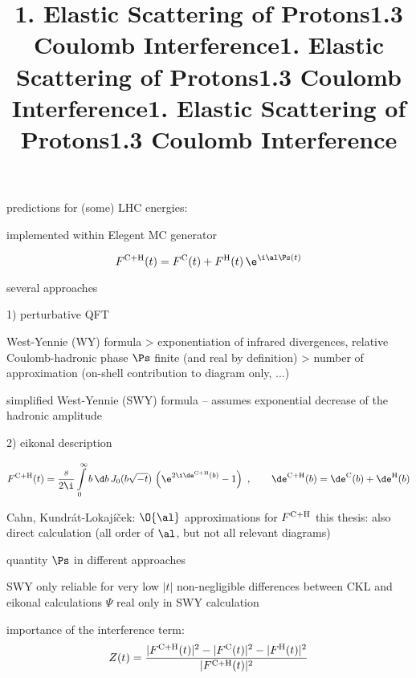 \> predictions for (some) LHC energies:

\centerline{}

\> implemented within Elegent MC generator


\newpage%
\title{1. Elastic Scattering of Protons\hfill 1.3 Coulomb Interference}

$$F^{\rm C+H}(t) = F^{\rm C}(t) + F^{\rm H}(t) \, \e^{\i \al \Ps(t)}$$

\> several approaches

1) perturbative QFT

\centerline{}

\> West-Yennie (WY) formula
\>> exponentiation of infrared divergences, relative Coulomb-hadronic phase $\Ps$ finite (and real by definition)
\>> number of approximation (on-shell contribution to diagram only, ...)

\> simplified West-Yennie (SWY) formula -- assumes exponential decrease of the hadronic amplitude


2) eikonal description

$$
	F^{\rm C+H}(t) = {s\over 2\i}\int\limits_0^\infty b\,\d b\,J_0(b\sqrt{-t})\,\left( \e^{2\i\de^{\rm C+H}(b)} - 1 \right)
	\ ,\qquad
	\de^{\rm C+H}(b) = \de^{\rm C}(b) + \de^{\rm H}(b)
$$

\> Cahn, Kundrát-Lokajíček: $\O{\al}$ approximations for $F^{\rm C+H}$
\> this thesis: also direct calculation (all order of $\al$, but not all relevant diagrams)

\newpage%
\title{1. Elastic Scattering of Protons\hfill 1.3 Coulomb Interference}

\> quantity $\Ps$ in different approaches

\centerline{}

\> SWY only reliable for very low $|t|$
\> non-negligible differences between CKL and eikonal calculations
\> $\Psi$ real only in SWY calculation

\newpage%
\title{1. Elastic Scattering of Protons\hfill 1.3 Coulomb Interference}

\> importance of the interference term:
$$Z(t) = {|F^{\rm C+H}(t)|^2 - |F^{\rm C}(t)|^2 - |F^{\rm H}(t)|^2\over |F^{\rm C+H}(t)|^2}$$

